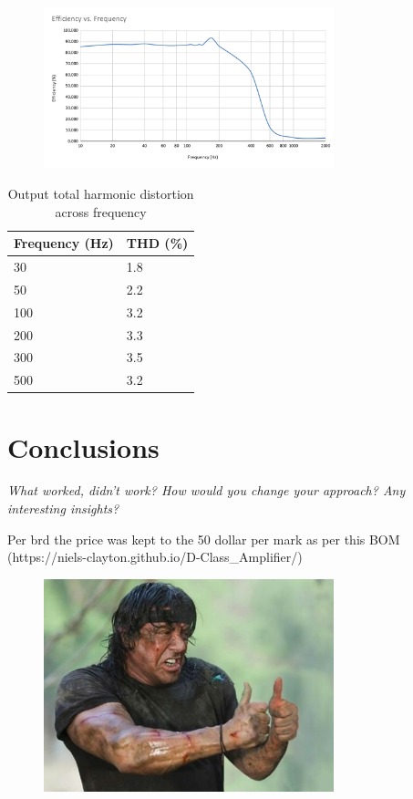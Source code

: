 \documentclass[11pt]{article}
\begin{document}
{\begin{figure}[h!]
  \centering
  \includegraphics[width=0.75\textwidth]{img/testing/Efficiency_vs._Frequency.pdf}
  \caption{}
\end{figure}

\begin{table}[h!]
  \centering
  \begin{tabular}{l|l}
  \rowcolor[HTML]{E0E0E0} 
  \textbf{Frequency (Hz)} & \textbf{THD (\%)} \\ \hline
  30                 & 1.8               \\
  50                 & 2.2               \\
  100                & 3.2               \\
  200                & 3.3               \\
  300                & 3.5               \\
  500                & 3.2              
  \end{tabular}
  \caption{Output total harmonic distortion across frequency}
  \label{T:THD}
\end{table}


\section{Conclusions}
 
\textit{What worked, didn’t work? How would you change your approach? Any interesting insights?}

Per brd the price was kept to the 50 dollar per mark as per this BOM (https://niels-clayton.github.io/D-Class\_Amplifier/)


\begin{figure}[h!]
  \centering
  \includegraphics[width=0.75\textwidth]{img/thumbs.png}  
  \caption{}
  \label{F:thumbs}
\end{figure}

}
\end{document}
